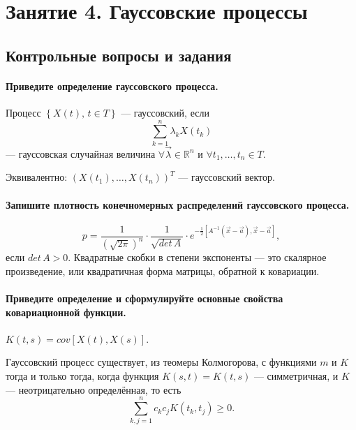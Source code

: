 \chapter*{Занятие 4. Гауссовские процессы}

\section*{Контрольные вопросы и задания}

\subsubsection*{Приведите определение гауссовского процесса.}

Процесс $ \left\{ X \left( t \right), \, t \in T \right\} $ --- гауссовский, если
$$ \sum \limits_{k = 1}^n \lambda_k X \left( t_k \right) $$
--- гауссовская случайная величина $ \forall \vec{ \lambda } \in \mathbb{R}^n$ и
$ \forall t_1, \dotsc, t_n \in T$.

Эквивалентно: $ \left( X \left( t_1 \right), \dotsc, X \left( t_n \right) \right)^T$ ---
гауссовский вектор.

\subsubsection*{Запишите плотность конечномерных распределений гауссовского процесса.}

$$p =
  \frac{1}{ \left( \sqrt{2 \pi} \right)^n} \cdot \frac{1}{ \sqrt{det \, A}} \cdot
  e^{-\frac{1}{2} \left[ A^{-1} \left( \vec{x} - \vec{a} \right), \vec{x} - \vec{a} \right] },$$
если $det \, A > 0$.
Квадратные скобки в степени экспоненты --- это скалярное произведение,
или квадратичная форма матрицы, обратной к ковариации.

\subsubsection*{Приведите определение и сформулируйте основные свойства ковариационной функции.}

$K \left( t, s \right) =
  cov \left[ X \left( t \right), X \left( s \right) \right] $.

Гауссовский процесс существует, из теомеры Колмогорова, с функциями $m$ и $K$ тогда и только тогда,
когда функция $K \left( s, t \right) = K \left( t, s \right) $ --- симметричная, и $K$ ---
неотрицательно определённая, то есть
$$ \sum \limits_{k, j = 1}^n c_k c_j K \left( t_k, t_j \right) \geq
  0.$$

